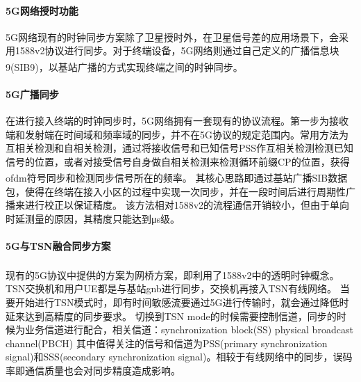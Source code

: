 \documentclass[UTF8,a4paper,12pt]{ctexart}
\numberwithin{equation}{section}
\begin{document}
	\paragraph{5G网络授时功能}
	5G网络现有的时钟同步方案除了卫星授时外，在卫星信号差的应用场景下，会采用1588v2协议进行同步。对于终端设备，5G网络则通过自己定义的广播信息块9(SIB9)，以基站广播的方式实现终端之间的时钟同步\textsuperscript{\cite{schungel2021optimized}}。
	
	\paragraph{5G广播同步}
	
	
	在进行接入终端的时钟同步时，5G网络拥有一套现有的协议流程。第一步为接收端和发射端在时间域和频率域的同步，并不在5G协议的规定范围内。常用方法为互相关检测和自相关检测，通过将接收信号和已知信号PSS作互相关检测检测已知信号的位置，或者对接受信号自身做自相关检测来检测循环前缀CP的位置，获得ofdm符号同步和检测同步信号所在的频率\textsuperscript{\cite{goodarzi2020synchronization}}。
	其核心思路即通过基站广播SIB数据包，使得在终端在接入小区的过程中实现一次同步，并在一段时间后进行周期性广播来进行校正以保证精度。
	该方法相对1588v2的流程通信开销较小，但由于单向时延测量的原因，其精度只能达到μs级。
	\begin{figure}[htb] 
	\end{figure}
	\paragraph{5G与TSN融合同步方案}
	现有的5G协议中提供的方案为网桥方案\textsuperscript{\cite{nikhileswar2022traffic}}，即利用了1588v2中的透明时钟概念。TSN交换机和用户UE都是与基站gnb进行同步，交换机再接入TSN有线网络。
	当要开始进行TSN模式时，即有时间敏感流要通过5G进行传输时，就会通过降低时延来达到高精度的同步要求。
	切换到TSN mode的时候需要控制信道，同步的时候为业务信道进行配合，相关信道：synchronization block(SS)   physical broadcast channel(PBCH)
	其中值得关注的信号和信道为PSS(primary synchronization signal)和SSS(secondary synchronization signal)。相较于有线网络中的同步，误码率即通信质量也会对同步精度造成影响。
\end{document}
